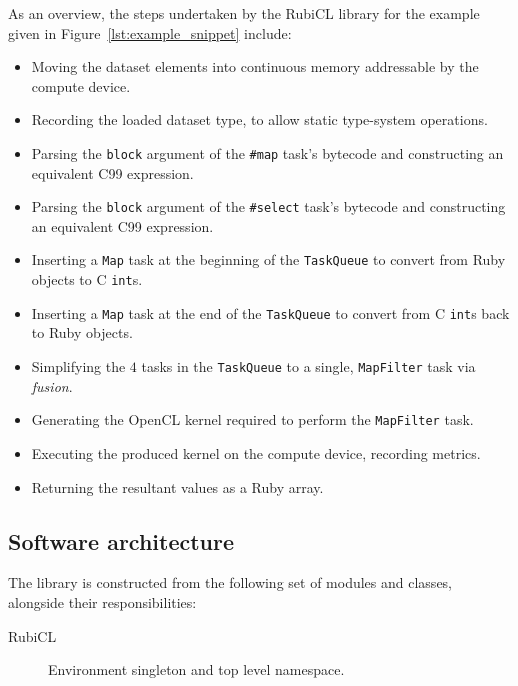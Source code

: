 As an overview, the steps undertaken by the RubiCL library for the example given in Figure~\ref{lst:example_snippet} include:
\begin{itemize}
  \item Moving the dataset elements into continuous memory addressable by the compute device.
  \item Recording the loaded dataset type, to allow static type-system operations.
  \item Parsing the \verb|block| argument of the \verb|#map| task's bytecode and constructing an equivalent C99 expression.
  \item Parsing the \verb|block| argument of the \verb|#select| task's bytecode and constructing an equivalent C99 expression.
  \item Inserting a \verb|Map| task at the beginning of the \verb|TaskQueue| to convert from Ruby objects to C \verb|int|s.
  \item Inserting a \verb|Map| task at the end of the \verb|TaskQueue| to convert from C \verb|int|s back to Ruby objects.
  \item Simplifying the $4$ tasks in the \verb|TaskQueue| to a single, \verb|MapFilter| task via \emph{fusion}.
  \item Generating the OpenCL kernel required to perform the \verb|MapFilter| task.
  \item Executing the produced kernel on the compute device, recording metrics.
  \item Returning the resultant values as a Ruby array.
\end{itemize}

\subsection{Software architecture}
The library is constructed from the following set of modules and classes, alongside their responsibilities:
\begin{description}
  \item[RubiCL] Environment singleton and top level namespace.
\end{description}


